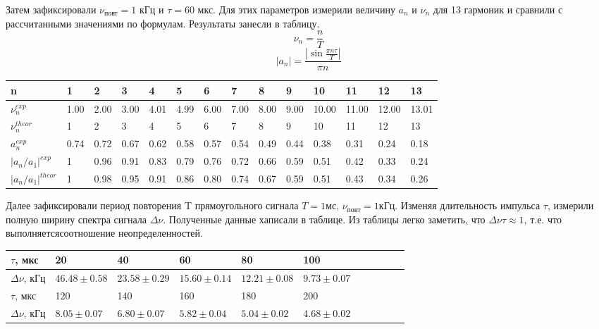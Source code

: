 \documentclass[a4paper,12pt]{article}
\begin{document}
Затем зафиксировали $\nu_{\text{повт}} = 1$ кГц и $\tau = 60$ мкс. Для этих параметров измерили величину $a_n$ и $\nu_n$ для 13 гармоник и сравнили с рассчитанными значениями по формулам. Результаты занесли в таблицу.
\[\nu_n = \frac{n}{T} \]
\[|a_n| = \frac{|\sin{ \frac{\pi n \tau}{T}}|}{\pi n}\]


\begin{center}
\begin{tabular}{|l|l|l|l|l|l|l|l|l|l|l|l|l|l|}
\hline
n                        & 1    & 2    & 3    & 4    & 5    & 6    & 7    & 8    & 9    & 10    & 11    & 12    & 13    \\ \hline
$\nu_n^{exp}$            & 1.00 & 2.00 & 3.00 & 4.01 & 4.99 & 6.00 & 7.00 & 8.00 & 9.00 & 10.00 & 11.00 & 12.00 & 13.01 \\ \hline
$\nu_n^{theor}$          & 1    & 2    & 3    & 4    & 5    & 6    & 7    & 8    & 9    & 10    & 11    & 12    & 13    \\ \hline
$a_n^{exp}$              & 0.74 & 0.72 & 0.67 & 0.62 & 0.58 & 0.57 & 0.54 & 0.49 & 0.44 & 0.38  & 0.31  & 0.24  & 0.18  \\ \hline
$|a_n / a_1|^{exp}$      & 1    & 0.96 & 0.91 & 0.83 & 0.79 & 0.76 & 0.72 & 0.66 & 0.59 & 0.51  & 0.42  & 0.33  & 0.24  \\ \hline
$|a_n / a_1|^{theor}$    & 1    & 0.98 & 0.95 & 0.91 & 0.86 & 0.80 & 0.74 & 0.67 & 0.59 & 0.51  & 0.43  & 0.34  & 0.26  \\ \hline
\end{tabular}
\end{center}





\FloatBarrier

Далее зафиксировали период повторения T прямоугольного сигнала $T = 1мс$, $\nu_{\text{повт}} = 1кГц$. Изменяя длительность импульса $\tau$, измерили полную ширину спектра сигнала $\Delta \nu$. Полученные данные хаписали в таблице. Из таблицы легко заметить, что $\Delta \nu \tau \approx 1$, т.е. что выполняетсясоотношение неопределенностей.


\begin{center}
\begin{tabular}{|l|l|l|l|l|l|l|l|l|l|l|}
\hline
$\tau$, мкс                  & 20    		& 40    	   & 60    	      & 80    		 & 100             \\ \hline
$\Delta \nu$, кГц            & $46.48 \pm 0.58$ & $23.58 \pm 0.29$ & $15.60 \pm 0.14$ & $12.21 \pm 0.08$ & $9.73 \pm 0.07$ \\ \hline 
$\tau$, мкс		     & 120    		& 140    	   & 160    	      & 180    		 & 200             \\ \hline
$\Delta \nu$, кГц	     & $8.05 \pm 0.07$  & $6.80 \pm 0.07$  & $5.82 \pm 0.04$  & $5.04 \pm 0.02$  & $4.68 \pm 0.02$ \\ \hline
\end{tabular}
\end{center}
\end{document}
